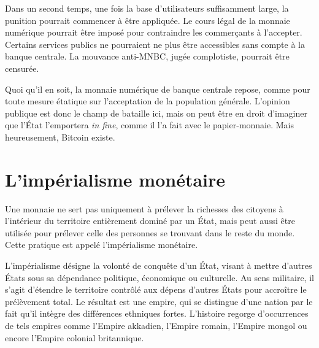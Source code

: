 Dans un second temps, une fois la base d'utilisateurs suffisamment large, la punition pourrait commencer à être appliquée. Le cours légal de la monnaie numérique pourrait être imposé pour contraindre les commerçants à l'accepter. Certains services publics ne pourraient ne plus être accessibles sans compte à la banque centrale. La mouvance anti-MNBC, jugée complotiste, pourrait être censurée.

%
Quoi qu'il en soit, la monnaie numérique de banque centrale repose, comme pour toute mesure étatique sur l'acceptation de la population générale. L'opinion publique est donc le champ de bataille ici, mais on peut être en droit d'imaginer que l'État l'emportera \emph{in fine}, comme il l'a fait avec le papier-monnaie. Mais heureusement, Bitcoin existe.



\section*{L'impérialisme monétaire} %

Une monnaie ne sert pas uniquement à prélever la richesses des citoyens à l'intérieur du territoire entièrement dominé par un État, mais peut aussi être utilisée pour prélever celle des personnes se trouvant dans le reste du monde. Cette pratique est appelé l'impérialisme monétaire.

L'impérialisme désigne la volonté de conquête d'un État, visant à mettre d'autres États sous sa dépendance politique, économique ou culturelle. Au sens militaire, il s'agit d'étendre le territoire contrôlé aux dépens d'autres États pour accroître le prélèvement total. Le résultat est une empire, qui se distingue d'une nation par le fait qu'il intègre des différences ethniques fortes. L'histoire regorge d'occurrences de tels empires comme l'Empire akkadien, l'Empire romain, l'Empire mongol ou encore l'Empire colonial britannique.


